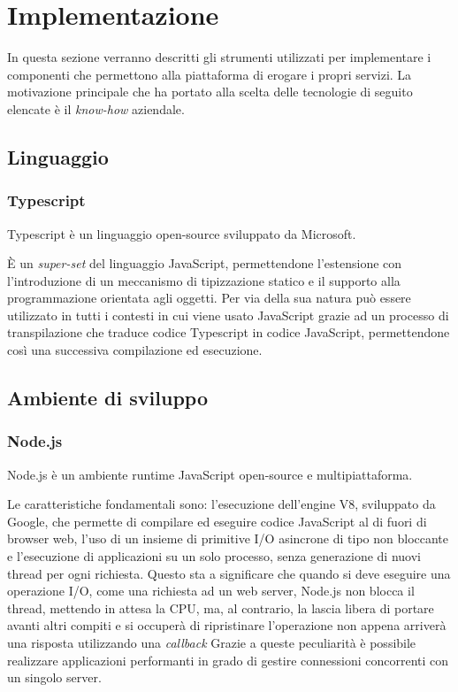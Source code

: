 \section{Implementazione}
In questa sezione verranno descritti gli strumenti utilizzati per implementare i componenti che
permettono alla piattaforma di erogare i propri servizi.
La motivazione principale che ha portato alla scelta delle tecnologie di seguito elencate è il \textit{know-how} aziendale.

\subsection{Linguaggio}
\subsubsection{Typescript}
Typescript\cite{Typescript} è un linguaggio open-source sviluppato da Microsoft.

È un \textit{super-set} del linguaggio JavaScript, permettendone l'estensione
con l'introduzione di un meccanismo di tipizzazione statico e il supporto alla programmazione orientata agli oggetti.
Per via della sua natura può essere utilizzato in tutti i contesti in cui viene usato JavaScript grazie ad un processo di transpilazione che traduce codice
Typescript in codice JavaScript, permettendone così una successiva compilazione ed esecuzione.

\subsection{Ambiente di sviluppo}
\subsubsection{Node.js}
Node.js\cite{Node} è un ambiente runtime JavaScript open-source e multipiattaforma.

Le caratteristiche fondamentali sono: l'esecuzione dell'engine V8, sviluppato da Google, che permette di compilare ed eseguire codice JavaScript al di fuori di browser web,
l'uso di un insieme di primitive I/O asincrone di tipo non bloccante e l'esecuzione di applicazioni su un solo processo, senza generazione di nuovi thread per ogni richiesta.
Questo sta a significare che quando si deve eseguire una operazione I/O, come una richiesta ad un web server, Node.js non blocca il thread, mettendo in attesa la CPU, ma, al contrario,
la lascia libera di portare avanti altri compiti e si occuperà di ripristinare l'operazione non appena arriverà una risposta utilizzando una \textit{callback}
Grazie a queste peculiarità è possibile realizzare applicazioni performanti in grado di gestire connessioni concorrenti con un singolo server.

